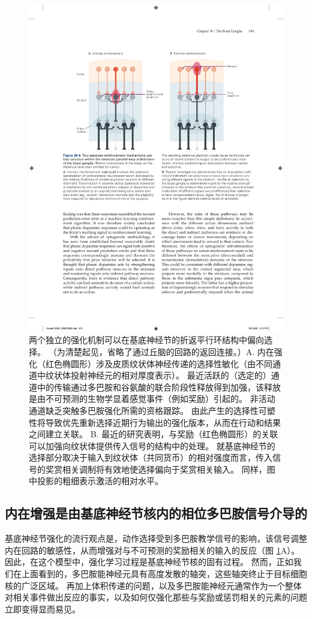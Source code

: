 \begin{figure}[htbp]
	\centering
	\includegraphics[width=0.8\linewidth]{chap38/fig_38_8}
	\caption{两个独立的强化机制可以在基底神经节的折返平行环结构中偏向选择。 （为清楚起见，省略了通过丘脑的回路的返回连接。）A. 内在强化（红色椭圆形）涉及皮质纹状体神经传递的选择性敏化（由不同通道中纹状体投射神经元的相对厚度表示）。 最近活跃的（选定的）通道中的传输通过多巴胺和谷氨酸的联合阶段性释放得到加强，该释放是由不可预测的生物学显着感觉事件（例如奖励）引起的。 非活动通道缺乏突触多巴胺强化所需的资格跟踪。 由此产生的选择性可塑性将导致优先重新选择近期行为输出的强化版本，从而在行动和结果之间建立关联。 B. 最近的研究表明，与奖励（红色椭圆形）的关联可以加强向纹状体提供传入信号的结构中的处理。 就基底神经节的选择部分取决于输入到纹状体（共同货币）的相对强度而言，传入信号的奖赏相关调制将有效地使选择偏向于奖赏相关输入。 同样，图中投影的粗细表示激活的相对水平。}
	\label{fig:38_8}
\end{figure}

\subsection{内在增强是由基底神经节核内的相位多巴胺信号介导的}
基底神经节强化的流行观点是，动作选择受到多巴胺教学信号的影响，该信号调整内在回路的敏感性，从而增强对与不可预测的奖励相关的输入的反应（图 \ref{fig:38_8}A）。 因此，在这个模型中，强化学习过程是基底神经节核的固有过程。 然而，正如我们在上面看到的，多巴胺能神经元具有高度发散的轴突，这些轴突终止于目标细胞核的广泛区域。 再加上体积传递的问题，以及多巴胺能神经元通常作为一个整体对相关事件做出反应的事实，以及如何仅强化那些与奖励或惩罚相关的元素的问题立即变得显而易见。


